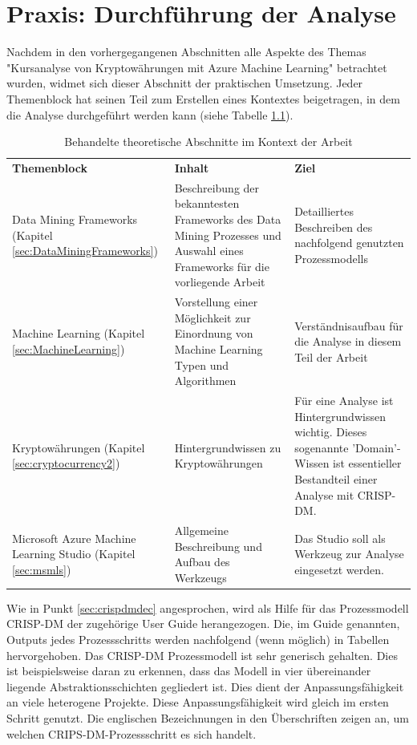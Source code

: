 \chapter{Praxis: Durchführung der Analyse}\label{chap:praxis}
Nachdem in den vorhergegangenen Abschnitten alle Aspekte des Themas "Kursanalyse von Kryptowährungen mit Azure Machine Learning" betrachtet wurden, widmet sich dieser Abschnitt der praktischen Umsetzung. Jeder Themenblock hat seinen Teil zum Erstellen eines Kontextes beigetragen, in dem die Analyse durchgeführt werden kann (siehe Tabelle \ref{tab:themeblocks}).
\begin{table}[H]
\begin{tabular}{|p{}|p{6cm}|p{7cm}|}
\hline
\textbf{Themenblock} & \textbf{Inhalt} & \textbf{Ziel}\\ 
\hhline{===}
Data Mining Frameworks (Kapitel \ref{sec:DataMiningFrameworks}) & Beschreibung der bekanntesten Frameworks des Data Mining Prozesses und Auswahl eines Frameworks für die vorliegende Arbeit & Detailliertes Beschreiben des nachfolgend genutzten Prozessmodells\\
\hline
Machine Learning (Kapitel \ref{sec:MachineLearning}) & Vorstellung einer Möglichkeit zur Einordnung von Machine Learning Typen und Algorithmen & Verständnisaufbau für die Analyse in diesem Teil der Arbeit\\
\hline
Kryptowährungen (Kapitel \ref{sec:cryptocurrency2}) & Hintergrundwissen zu Kryptowährungen & Für eine Analyse ist Hintergrundwissen wichtig. Dieses sogenannte 'Domain'-Wissen ist essentieller Bestandteil einer Analyse mit CRISP-DM. \\
\hline
Microsoft Azure Machine Learning Studio (Kapitel \ref{sec:msmls}) & Allgemeine Beschreibung und Aufbau des Werkzeugs & Das Studio soll als Werkzeug zur Analyse eingesetzt werden.\\
\hline
\end{tabular}
\caption{Behandelte theoretische Abschnitte im Kontext der Arbeit}
\label{tab:themeblocks}
\end{table}
Wie in Punkt \ref{sec:crispdmdec} angesprochen, wird als Hilfe für das Prozessmodell CRISP-DM der zugehörige User Guide \citep[S.~30-56]{chapman_crisp-dm_2000} herangezogen. Die, im Guide genannten, Outputs jedes Prozessschritts werden nachfolgend (wenn möglich) in Tabellen hervorgehoben. Das CRISP-DM Prozessmodell ist sehr generisch gehalten. Dies ist beispielsweise daran zu erkennen, dass das Modell in vier übereinander liegende Abstraktionsschichten gegliedert ist.\citep[S.~6]{chapman_crisp-dm_2000} Dies dient der Anpassungsfähigkeit an viele heterogene Projekte. Diese Anpassungsfähigkeit wird gleich im ersten Schritt genutzt. Die englischen Bezeichnungen in den Überschriften zeigen an, um welchen CRIPS-DM-Prozessschritt es sich handelt.
 
